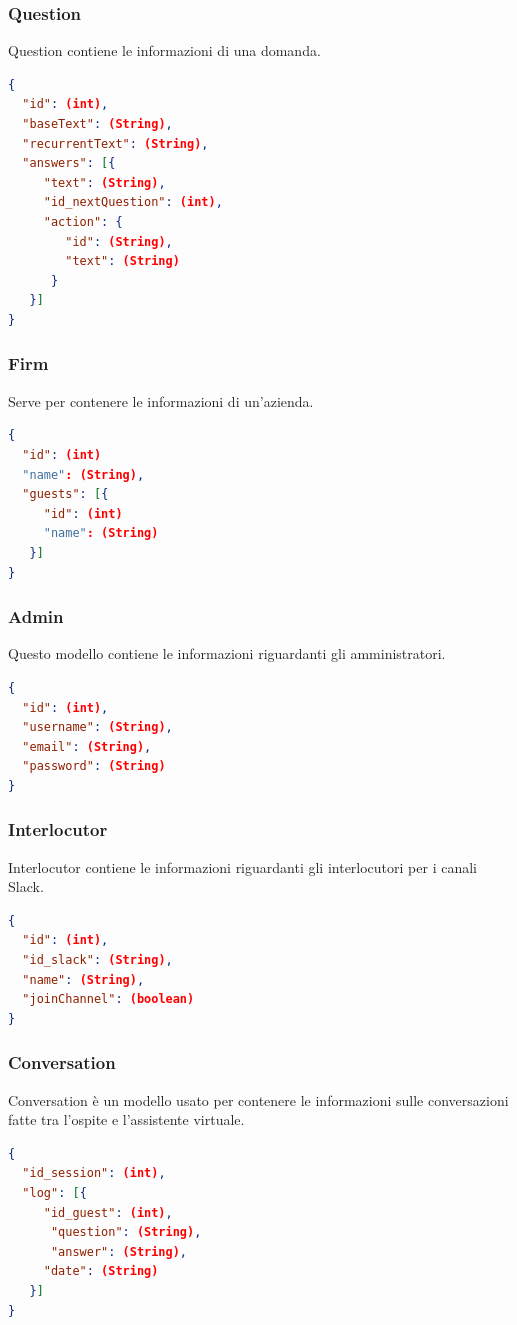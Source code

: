 \documentclass[../DefinizioneDiProdotto.tex]{subfiles}
\begin{document}
		\subsubsection{Question}
		Question contiene le informazioni di una domanda.
		\begin{lstlisting}[language=json,firstnumber=1]
{
  "id": (int),
  "baseText": (String),
  "recurrentText": (String),
  "answers": [{
     "text": (String),
     "id_nextQuestion": (int),
     "action": {
        "id": (String),
        "text": (String)
      }
   }]
}
		\end{lstlisting}

		\subsubsection{Firm}
		Serve per contenere le informazioni di un'azienda.
		\begin{lstlisting}[language=json,firstnumber=1]
{
  "id": (int)
  "name": (String),
  "guests": [{
     "id": (int)
     "name": (String)
   }]
}
		\end{lstlisting}

		\subsubsection{Admin}
		Questo modello contiene le informazioni riguardanti gli amministratori.
		\begin{lstlisting}[language=json,firstnumber=1]
{
  "id": (int),
  "username": (String),
  "email": (String),
  "password": (String)
}
		\end{lstlisting}

		\subsubsection{Interlocutor}
		Interlocutor contiene le informazioni riguardanti gli interlocutori per i canali Slack.
		\begin{lstlisting}[language=json,firstnumber=1]
{
  "id": (int),
  "id_slack": (String),
  "name": (String),
  "joinChannel": (boolean)
}
		\end{lstlisting}

		\subsubsection{Conversation}
		Conversation è un modello usato per contenere le informazioni sulle conversazioni fatte tra l'ospite e l'assistente virtuale.
		\begin{lstlisting}[language=json,firstnumber=1]
{
  "id_session": (int),
  "log": [{
     "id_guest": (int),
      "question": (String),
      "answer": (String),
     "date": (String)
   }]
}
		\end{lstlisting}
\end{document}
